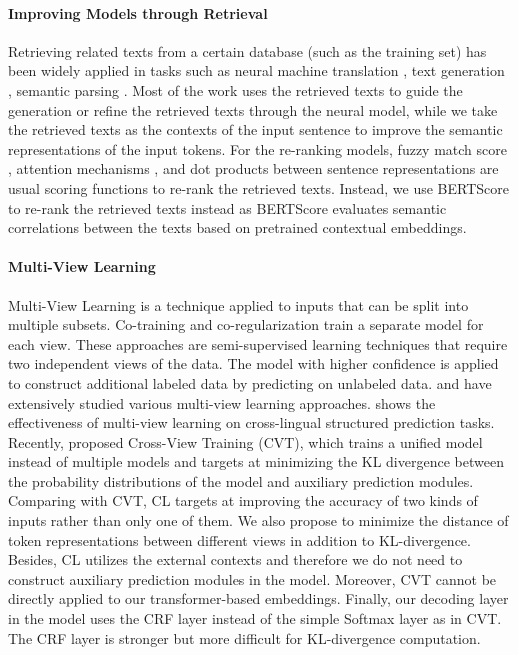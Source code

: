 \paragraph{Improving Models through Retrieval}
Retrieving related texts from a certain database (such as the training set) has been widely applied in tasks such as neural machine translation \citep{gu2018search,zhang-etal-2018-guiding,xu-etal-2020-boosting}, text generation \citep{weston-etal-2018-retrieve,kim-etal-2020-retrieval}, semantic parsing \citep{hashimoto2018retrieve,guo-etal-2019-coupling}. Most of the work uses the retrieved texts to guide the generation or refine the retrieved texts through the neural model, while we take the retrieved texts as the contexts of the input sentence to improve the semantic representations of the input tokens.
For the re-ranking models, fuzzy match score \citep{gu2018search,zhang-etal-2018-guiding,hayati-etal-2018-retrieval,xu-etal-2020-boosting}, attention mechanisms \citep{cao-etal-2018-retrieve,cai-etal-2019-retrieval}, and dot products between sentence representations \citep{lewis2020retrieval,xu-etal-2020-boosting} are usual scoring functions to re-rank the retrieved texts. Instead, we use BERTScore to re-rank the retrieved texts instead as BERTScore evaluates semantic correlations between the texts based on pretrained contextual embeddings.

\paragraph{Multi-View Learning}
Multi-View Learning is a technique applied to inputs that can be split into multiple subsets. Co-training \citep{blum1998combining} and co-regularization \citep{sindhwani2005co} train a separate model for each view. These approaches are semi-supervised learning techniques that require two independent views of the data. The model with higher confidence is applied to construct additional labeled data by predicting on unlabeled data. \citet{sun2013survey} and \citet{xu2013survey} have extensively studied various multi-view learning approaches. \citet{hu2021multi} shows the effectiveness of multi-view learning on cross-lingual structured prediction tasks. Recently, \citet{clark-etal-2018-semi} proposed Cross-View Training (CVT), which trains a unified model instead of multiple models and targets at minimizing the KL divergence between the probability distributions of the model and auxiliary prediction modules. Comparing with CVT, CL targets at improving the accuracy of two kinds of inputs rather than only one of them. We also propose to minimize the distance of token representations between different views in addition to KL-divergence. Besides, CL utilizes the external contexts and therefore we do not need to construct auxiliary prediction modules in the model. Moreover, CVT cannot be directly applied to our transformer-based embeddings. Finally, our decoding layer in the model uses the CRF layer instead of the simple Softmax layer as in CVT. The CRF layer is stronger but more difficult for KL-divergence computation.

